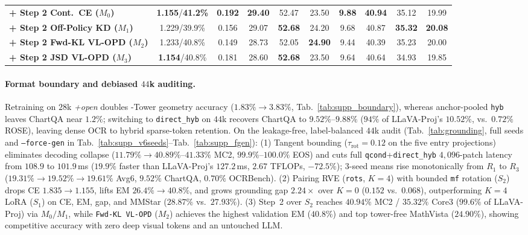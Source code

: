\begin{table}[t]
{\begin{tabular}{@{}lccccccccc@{}}
\textbf{+ Step 2 Cont.\ CE ($M_0$)}              & \textbf{1.155}/\textbf{41.2\%} & \textbf{0.192} & \textbf{29.40} & 52.47 & 23.50 & \textbf{9.88} & \textbf{40.94} & 35.12 & 19.99 \\
\textbf{+ Step 2 Off-Policy KD ($M_1$)}          & 1.229/39.9\% & 0.156 & 29.07 & \textbf{52.68} & 24.20 & 9.68 & 40.87 & \textbf{35.32} & \textbf{20.08} \\
\textbf{+ Step 2 Fwd-KL VL-OPD ($M_2$)}          & 1.233/40.8\% & 0.149 & 28.73 & 52.05 & \textbf{24.90} & 9.44 & 40.39 & 35.23 & 20.00 \\
\textbf{+ Step 2 JSD VL-OPD ($M_3$)}             & \textbf{1.154}/40.8\% & 0.181 & 28.60 & \textbf{52.68} & 23.50 & 9.64 & 40.64 & 34.93 & 19.85 \\
\bottomrule
\end{tabular}}
\end{table}

\paragraph{Format boundary and debiased $44$k auditing.}
Retraining on $28$k \emph{+open} doubles \modelname-Tower geometry accuracy
($1.83\%{\to}3.83\%$, Tab.~\ref{tab:supp_boundary}), whereas anchor-pooled
\texttt{hyb} leaves ChartQA near $1.2\%$; switching to \texttt{direct\_hyb} on
$44$k recovers ChartQA to $9.52\%$--$9.88\%$ ($94\%$ of LLaVA-Proj's $10.52\%$,
vs.\ $0.72\%$ ROSE), leaving dense OCR to hybrid sparse-token retention. On the
leakage-free, label-balanced $44$k audit (Tab.~\ref{tab:grounding}, full seeds
and \texttt{--force-gen} in Tab.~\ref{tab:supp_v6seeds}--Tab.~\ref{tab:supp_fgen}):
(1) Tangent bounding ($\tau_{\mathrm{rot}}{=}0.12$ on the five entry
projections) eliminates decoding collapse ($11.79\%{\to}40.89\%$--$41.33\%$ MC2,
$99.9\%$--$100.0\%$ EOS) and cuts full \texttt{qcond}+\texttt{direct\_hyb}
$4{,}096$-patch latency from $108.9$ to $101.9$\,ms ($19.9\%$ faster than
LLaVA-Proj's $127.2$\,ms, $2.67$ TFLOPs, $-72.5\%$); $3$-seed means rise
monotonically from $R_1$ to $R_3$ ($19.31\%{\to}19.52\%{\to}19.61\%$ Avg6,
$9.52\%$ ChartQA, $0.70\%$ OCRBench).
(2) Pairing RVE (\texttt{rots}, $K{=}4$) with bounded \texttt{mf} rotation
($S_2$) drops CE $1.835{\to}1.155$, lifts EM $26.4\%{\to}40.8\%$, and grows
grounding gap $2.24\times$ over $K{=}0$ ($0.152$ vs.\ $0.068$), outperforming
$K{=}4$ LoRA ($S_1$) on CE, EM, gap, and MMStar ($28.87\%$ vs.\ $27.93\%$).
(3) Step~2 over $S_2$ reaches $40.94\%$ MC2 / $35.32\%$ Core3 ($99.6\%$ of
LLaVA-Proj) via $M_0/M_1$, while \texttt{Fwd-KL VL-OPD} ($M_2$) achieves the
highest validation EM ($40.8\%$) and top tower-free MathVista ($24.90\%$),
showing competitive accuracy with zero deep visual tokens and an untouched LLM.
